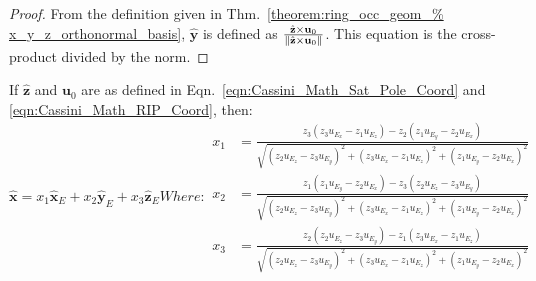         \begin{proof}
            From the definition given in
            Thm.~\ref{theorem:ring_occ_geom_%
                      x_y_z_orthonormal_basis},
            $\hat{\mathbf{y}}$ is defined as
            $\frac{\hat{\mathbf{z}}\times\mathbf{u}_{0}}%
                  {\norm{\hat{\mathbf{z}}\times\mathbf{u}_{0}}}$.
            This equation is the
            cross-product divided by the norm.
        \end{proof}
        \begin{theorem}
            If $\hat{\mathbf{z}}$ and
            $\mathbf{u}_{0}$ are as defined in
            Eqn.~\ref{eqn:Cassini_Math_Sat_Pole_Coord}
            and \ref{eqn:Cassini_Math_RIP_Coord}, then:
            \begin{subequations}
                \begin{equation}
                    \hat{\mathbf{x}}=
                        x_{1}\hat{\mathbf{x}}_{E}+
                        x_{2}\hat{\mathbf{y}}_{E}+
                        x_{3}\hat{\mathbf{z}}_{E}
                \end{equation}
                Where:
                \begin{align}
                    x_1
                    &=\frac{z_{3}(z_{3}u_{E_{x}}-z_{1}u_{E_{z}})-
                            z_{2}(z_{1}u_{E_{y}}-z_{2}u_{E_{x}})}
                           {\sqrt{(z_{2}u_{E_{z}}-z_{3}u_{E_{y}})^{2}+
                            (z_{3}u_{E_{x}}-z_{1}u_{E_{z}})^{2}+
                            (z_{1}u_{E_{y}}-z_{2}u_{E_{x}})^{2}}}\\
                    x_2
                    &=\frac{z_{1}(z_{1}u_{E_{y}}-
                            z_{2}u_{E_{x}})-z_{3}(z_{2}u_{E_{z}}-
                            z_{3}u_{E_{y}})}
                           {\sqrt{(z_{2}u_{E_{z}}-z_{3}u_{E_{y}})^{2}+
                            (z_{3}u_{E_{x}}-z_{1}u_{E_{z}})^{2}+
                            (z_{1}u_{E_{y}}-z_{2}u_{E_{x}})^{2}}}\\
                    x_3
                    &=\frac{z_{2}(z_{2}u_{E_{z}}-
                            z_{3}u_{E_{y}})-z_{1}(z_{3}u_{E_{x}}-
                            z_{1}u_{E_{z}})}
                           {\sqrt{(z_{2}u_{E_{z}}-z_{3}u_{E_{y}})^{2}+
                            (z_{3}u_{E_{x}}-z_{1}u_{E_{z}})^{2}+
                            (z_{1}u_{E_{y}}-z_{2}u_{E_{x}})^{2}}}
                \end{align}
            \end{subequations}
            \end{theorem}
